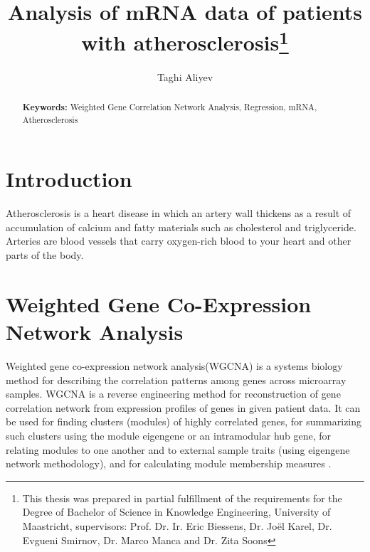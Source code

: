 \documentclass{ba-kecs}
\numberwithin{figure}{section}
\numberwithin{equation}{section}
\begin{document}
\title{Analysis of mRNA data of patients with atherosclerosis\footnote{This thesis was prepared in partial fulfillment of the requirements
 for the Degree of Bachelor of Science in Knowledge Engineering,
University of Maastricht,  supervisors: Prof. Dr. Ir. Eric Biessens, Dr. Jo\"{e}l Karel, Dr. Evgueni Smirnov, Dr. Marco Manca and Dr. Zita Soons}}
\author{Taghi Aliyev \\}
\maketitle

\makeatletter
\let\ps@oldempty\ps@empty %
\renewcommand\ps@empty\ps@plain
\makeatother


\begin{abstract}

\smallskip
\noindent \textbf{Keywords: } Weighted Gene Correlation Network Analysis, Regression, mRNA, Atherosclerosis
\end{abstract}


\section{Introduction}
Atherosclerosis is a heart disease in which an artery wall thickens as a result of accumulation of calcium and fatty materials such as cholesterol and triglyceride. Arteries are blood vessels that carry oxygen-rich blood to your heart and other parts of the body. 
\section{Weighted Gene Co-Expression Network Analysis}
Weighted gene co-expression network analysis(WGCNA) is a systems biology method for describing the correlation patterns among genes across microarray samples. WGCNA is a reverse engineering method for reconstruction of gene correlation network from expression profiles of genes in given patient data. It can be used for finding clusters (modules) of highly correlated genes, for summarizing such clusters using the module eigengene or an intramodular hub gene, for relating modules to one another and to external sample traits (using eigengene network methodology), and for calculating module membership measures \cite{wgcna}.
\end{document}
